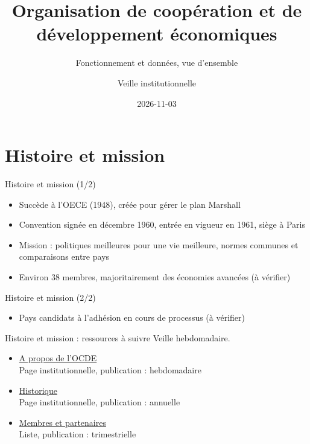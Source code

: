 \documentclass[aspectratio=169,11pt]{beamer}
\title{Organisation de coopération et de développement économiques}
\subtitle{Fonctionnement et données, vue d'ensemble}
\author{Veille institutionnelle}
\date{2026-11-03}
\begin{document}
\begin{frame}\titlepage\end{frame}

\section{Histoire et mission}
\begin{frame}{Histoire et mission (1/2)}
\begin{itemize}
\item Succède à l'OECE (1948), créée pour gérer le plan Marshall
\item Convention signée en décembre 1960, entrée en vigueur en 1961, siège à Paris
\item Mission : politiques meilleures pour une vie meilleure, normes communes et comparaisons entre pays
\item Environ 38 membres, majoritairement des économies avancées (à vérifier)
\end{itemize}
\end{frame}

\begin{frame}{Histoire et mission (2/2)}
\begin{itemize}
\item Pays candidats à l'adhésion en cours de processus (à vérifier)
\end{itemize}
\end{frame}

\begin{frame}{Histoire et mission : ressources à suivre}
\small
Veille hebdomadaire.
\begin{itemize}
\item \href{https://www.oecd.org/en/about.html}{A propos de l'OCDE}\\{\footnotesize Page institutionnelle, publication : hebdomadaire}
\item \href{https://www.oecd.org/en/about/history.html}{Historique}\\{\footnotesize Page institutionnelle, publication : annuelle}
\item \href{https://www.oecd.org/en/about/members-partners.html}{Membres et partenaires}\\{\footnotesize Liste, publication : trimestrielle}
\end{itemize}
\end{frame}
\end{document}
